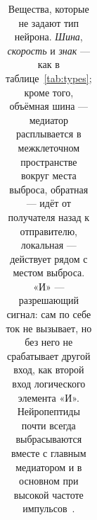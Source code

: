 \begin{table}[t]
\begin{tabular}{>{\raggedright}p{2.25cm}>{\raggedright}p{2.8cm}>{\raggedright}p{1.8cm}>{\raggedright}p{1.5cm}>{\centering}p{0.8cm}>{\raggedright\arraybackslash}p{4.3cm}}
\bottomrule
\end{tabular}
\caption{Вещества, которые не задают тип нейрона. \emph{Шина}, \emph{скорость} и \emph{знак} --- как в таблице~\ref{tab:types}; кроме того, объёмная шина --- медиатор расплывается в межклеточном пространстве вокруг места выброса, обратная --- идёт от получателя назад к отправителю, локальная --- действует рядом с местом выброса. «И» --- разрешающий сигнал: сам по себе ток не вызывает, но без него не срабатывает другой вход, как второй вход логического элемента «И». Нейропептиды почти всегда выбрасываются вместе с главным медиатором и в основном при высокой частоте импульсов~\cite{vandenPol2012}.}
\label{tab:othermediators}
\end{table}
